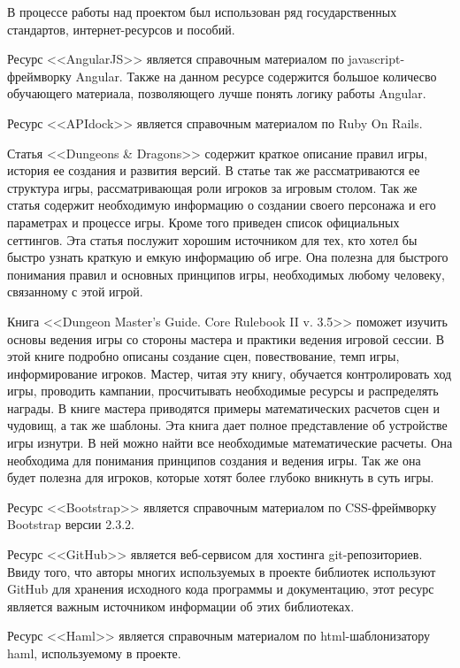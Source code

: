 В процессе работы над проектом был использован ряд государственных стандартов, интернет-ресурсов и пособий.

Ресурс <<AngularJS>> является справочным материалом по javascript-фреймворку Angular. Также на данном ресурсе содержится большое количесво обучающего материала, позволяющего лучше понять логику работы Angular.

Ресурс <<APIdock>> является справочным материалом по Ruby On Rails.

Статья <<Dungeons \& Dragons>> содержит краткое описание правил игры, история ее создания и развития версий. В статье так же рассматриваются ее структура игры, рассматривающая роли игроков за игровым столом. Так же статья содержит необходимую информацию о создании своего персонажа и его параметрах и процессе игры. Кроме того приведен список официальных сеттингов. Эта статья послужит хорошим источником для тех, кто хотел бы быстро узнать краткую и емкую информацию об игре. Она полезна для быстрого понимания правил и основных принципов игры, необходимых любому человеку, связанному с этой игрой.

Книга <<Dungeon Master's Guide. Core Rulebook II v. 3.5>> поможет изучить основы ведения игры со стороны мастера и практики ведения игровой сессии. В этой книге подробно описаны создание сцен, повествование, темп игры, информирование игроков. Мастер, читая эту книгу, обучается контролировать ход игры, проводить кампании, просчитывать необходимые ресурсы и распределять награды. В книге мастера приводятся примеры математических расчетов сцен и чудовищ, а так же шаблоны. Эта книга дает полное представление об устройстве игры изнутри. В ней можно найти все необходимые математические расчеты. Она необходима для понимания принципов создания и ведения игры. Так же она будет полезна для игроков, которые хотят более глубоко вникнуть в суть игры.

Ресурс <<Bootstrap>> является справочным материалом по CSS-фреймворку Bootstrap версии 2.3.2.

Ресурс <<GitHub>> является веб-сервисом для хостинга git-репозиториев. Ввиду того, что авторы многих используемых в проекте библиотек используют GitHub для хранения исходного кода программы и документацию, этот ресурс является важным источником информации об этих библиотеках.

Ресурс <<Haml>> является справочным материалом по html-шаблонизатору haml, используемому в проекте.

